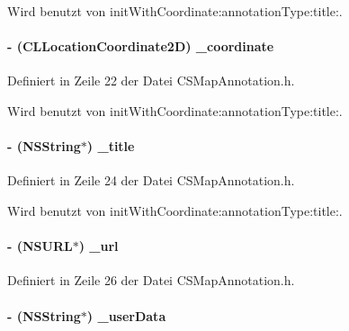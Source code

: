 Wird benutzt von initWithCoordinate:annotationType:title:.\hypertarget{interface_c_s_map_annotation_a582707c028b9f92b952475fc0d6b6fee}{
\paragraph[{\_\-coordinate}]{\setlength{\rightskip}{0pt plus 5cm}-\/ (CLLocationCoordinate2D) {\bf \_\-coordinate}}\hfill}
\label{interface_c_s_map_annotation_a582707c028b9f92b952475fc0d6b6fee}


Definiert in Zeile 22 der Datei CSMapAnnotation.h.

Wird benutzt von initWithCoordinate:annotationType:title:.\hypertarget{interface_c_s_map_annotation_ab46f2fe2f09d5a915a7822be0afe075a}{
\paragraph[{\_\-title}]{\setlength{\rightskip}{0pt plus 5cm}-\/ (NSString$\ast$) {\bf \_\-title}}\hfill}
\label{interface_c_s_map_annotation_ab46f2fe2f09d5a915a7822be0afe075a}


Definiert in Zeile 24 der Datei CSMapAnnotation.h.

Wird benutzt von initWithCoordinate:annotationType:title:.\hypertarget{interface_c_s_map_annotation_aa08c22c0cfbd8cf2c4f05cbfc992d006}{
\paragraph[{\_\-url}]{\setlength{\rightskip}{0pt plus 5cm}-\/ (NSURL$\ast$) {\bf \_\-url}}\hfill}
\label{interface_c_s_map_annotation_aa08c22c0cfbd8cf2c4f05cbfc992d006}


Definiert in Zeile 26 der Datei CSMapAnnotation.h.\hypertarget{interface_c_s_map_annotation_a59d92c9b7f147399b428a5ef97eef757}{
\paragraph[{\_\-userData}]{\setlength{\rightskip}{0pt plus 5cm}-\/ (NSString$\ast$) {\bf \_\-userData}}\hfill}
\label{interface_c_s_map_annotation_a59d92c9b7f147399b428a5ef97eef757}


